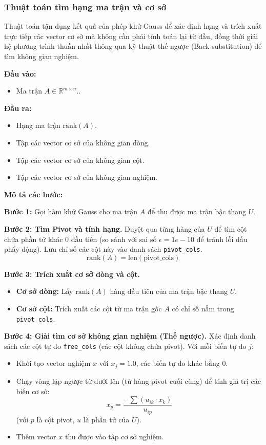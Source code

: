 \documentclass[a4paper]{article}
\begin{document}
\subsubsection{Thuật toán tìm hạng ma trận và cơ sở}

Thuật toán tận dụng kết quả của phép khử Gauss để xác định hạng và trích xuất trực tiếp các vector cơ sở mà không cần phải tính toán lại từ đầu, đồng thời giải hệ phương trình thuần nhất thông qua kỹ thuật thế ngược (Back-substitution) để tìm không gian nghiệm.

\textbf{Đầu vào: }

\begin{itemize}
    \item Ma trận $A \in \mathbb{R}^{m \times n}$..
\end{itemize}

\textbf{Đầu ra: }

\begin{itemize}
    \item Hạng ma trận $\text{rank}(A)$.
    \item Tập các vector cơ sở của không gian dòng.
    \item Tập các vector cơ sở của không gian cột.
    \item Tập các vector cơ sở của không gian nghiệm.
\end{itemize}

\textbf{Mô tả các bước: }

\textbf{Bước 1: } Gọi hàm khử Gauss cho ma trận $A$ để thu được ma trận bậc thang $U$.

\textbf{Bước 2: Tìm Pivot và tính hạng.}
Duyệt qua từng hàng của $U$ để tìm cột chứa phần tử khác $0$ đầu tiên (so sánh với sai số $\epsilon = 1e-10$ để tránh lỗi dấu phẩy động). Lưu chỉ số các cột này vào danh sách \texttt{pivot\_cols}. 
\begin{equation}
    \text{rank}(A) = \text{len}(\text{pivot\_cols})
\end{equation}

\textbf{Bước 3: Trích xuất cơ sở dòng và cột.}
\begin{itemize}
    \item \textbf{Cơ sở dòng:} Lấy $\text{rank}(A)$ hàng đầu tiên của ma trận bậc thang $U$.
    \item \textbf{Cơ sở cột:} Trích xuất các cột từ ma trận gốc $A$ có chỉ số nằm trong \texttt{pivot\_cols}.
\end{itemize}

\textbf{Bước 4: Giải tìm cơ sở không gian nghiệm (Thế ngược).}
Xác định danh sách các cột tự do \texttt{free\_cols} (các cột không chứa pivot). Với mỗi biến tự do $j$:
\begin{itemize}
    \item Khởi tạo vector nghiệm $x$ với $x_j = 1.0$, các biến tự do khác bằng $0$.
    \item Chạy vòng lặp ngược từ dưới lên (từ hàng pivot cuối cùng) để tính giá trị các biến cơ sở:
    $$x_p = \frac{-\sum (u_{ik} \cdot x_k)}{u_{ip}}$$
    (với $p$ là cột pivot, $u$ là phần tử của $U$).
    \item Thêm vector $x$ thu được vào tập cơ sở nghiệm.
\end{itemize}
\end{document}

